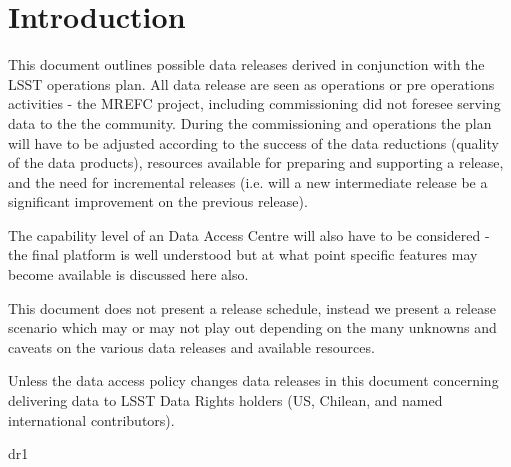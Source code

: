 \section{Introduction} \label{sec:intro}
This document outlines possible data
releases derived in conjunction with the LSST  operations plan.
All data release are seen as operations or pre operations activities - the MREFC project, including commissioning did not foresee serving data to the the community.
During the commissioning and operations  the plan will have to
be adjusted according to the success of the data reductions (quality of the data
products), resources available for preparing and supporting a release, and the need for incremental
releases (i.e. will a new intermediate release be a significant improvement on the previous
release).

The capability level of an Data Access Centre will also have to be considered - the final platform is well understood 
but at what point specific features may become available is discussed here also.

This document does not present a release schedule, instead we present a
release scenario which may or may not play out depending on the many unknowns and caveats
on the various data releases and available resources.

Unless the data access policy changes data releases in this document concerning delivering data to LSST Data Rights holders (US, Chilean, and named international contributors).




 {dr1}




